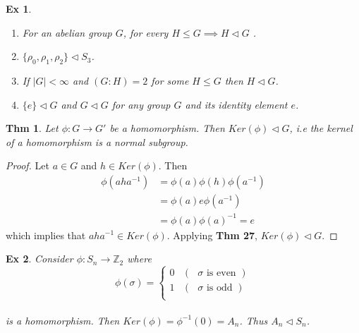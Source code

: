 \documentclass[paper=a4, fontsize=11pt]{scrartcl}
\newcommand{\Zn}[1]{\mathbb{Z}_{#1}}
\newcommand{\nextline}{$ $ \newline \vspace{-0.15in}}
\newtheorem{theorem}{Thm}
\newtheorem{example}{Ex}
\begin{document}
\begin{example}
\nextline
\begin{enumerate}
	\item For an abelian group $G$, for every $H \leqslant G \implies H \triangleleft G$ .
	\item $\{\rho_0 ,\rho_1 , \rho_2 \} \triangleleft S_3$.
	\item If $|G|<\infty$ and $(G:H)=2$ for some $H \leqslant G$ then $H \triangleleft G$.
	\item $\{e\}\triangleleft G$ and $G \triangleleft G$ for any group $G$ and its identity element $e$.
\end{enumerate}
\end{example}

\vspace{0.15in}

\begin{theorem}
	Let $\phi:G\to G'$ be a homomorphism. Then $Ker(\phi) \triangleleft G$, i.e the kernel of a homomorphism is a normal subgroup.\\
\end{theorem}

\begin{proof}
	Let $a\in G$ and $h\in Ker(\phi)$. Then 
	\begin{equation}\nonumber
		\begin{split}
		\phi(aha^{-1}) &= \phi(a)\phi(h)\phi(a^{-1}) \\
		&= \phi(a)e\phi(a^{-1}) \\
		&= \phi(a)\phi(a)^{-1} = e
		\end{split}
	\end{equation}
	which implies that $aha^{-1} \in Ker(\phi)$. Applying \textbf{Thm 27}, $Ker(\phi) \triangleleft G$.
\end{proof}

\vspace{0.15in}

\begin{example}
	Consider $\phi : S_n \to \Zn{2}$ where \\
	\begin{equation}\nonumber
		\phi(\sigma) =
		\begin{cases}
		0 &(\text{ }\sigma \text{ is even }) \\
		1 &(\text{ }\sigma \text{ is odd }) \\
		\end{cases}
	\end{equation}\\
	is a homomorphism. Then $Ker(\phi)=\phi^{-1}(0)=A_n$. Thus $A_n \triangleleft S_n$.
\end{example}
\end{document}

